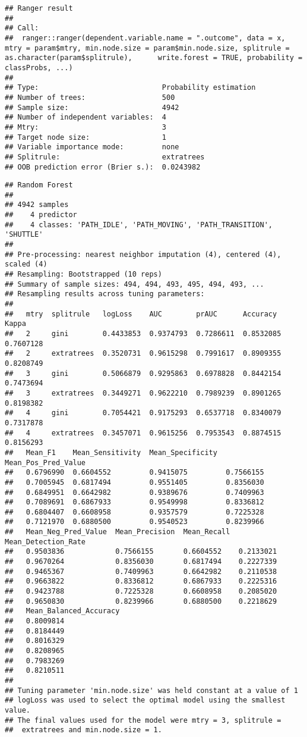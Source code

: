 \documentclass[]{article}
\begin{document}
\begin{verbatim}
## Ranger result
## 
## Call:
##  ranger::ranger(dependent.variable.name = ".outcome", data = x,      mtry = param$mtry, min.node.size = param$min.node.size, splitrule = as.character(param$splitrule),      write.forest = TRUE, probability = classProbs, ...) 
## 
## Type:                             Probability estimation 
## Number of trees:                  500 
## Sample size:                      4942 
## Number of independent variables:  4 
## Mtry:                             3 
## Target node size:                 1 
## Variable importance mode:         none 
## Splitrule:                        extratrees 
## OOB prediction error (Brier s.):  0.0243982
\end{verbatim}

\begin{verbatim}
## Random Forest 
## 
## 4942 samples
##    4 predictor
##    4 classes: 'PATH_IDLE', 'PATH_MOVING', 'PATH_TRANSITION', 'SHUTTLE' 
## 
## Pre-processing: nearest neighbor imputation (4), centered (4), scaled (4) 
## Resampling: Bootstrapped (10 reps) 
## Summary of sample sizes: 494, 494, 493, 495, 494, 493, ... 
## Resampling results across tuning parameters:
## 
##   mtry  splitrule   logLoss    AUC        prAUC      Accuracy   Kappa    
##   2     gini        0.4433853  0.9374793  0.7286611  0.8532085  0.7607128
##   2     extratrees  0.3520731  0.9615298  0.7991617  0.8909355  0.8208749
##   3     gini        0.5066879  0.9295863  0.6978828  0.8442154  0.7473694
##   3     extratrees  0.3449271  0.9622210  0.7989239  0.8901265  0.8198382
##   4     gini        0.7054421  0.9175293  0.6537718  0.8340079  0.7317878
##   4     extratrees  0.3457071  0.9615256  0.7953543  0.8874515  0.8156293
##   Mean_F1    Mean_Sensitivity  Mean_Specificity  Mean_Pos_Pred_Value
##   0.6796990  0.6604552         0.9415075         0.7566155          
##   0.7005945  0.6817494         0.9551405         0.8356030          
##   0.6849951  0.6642982         0.9389676         0.7409963          
##   0.7089691  0.6867933         0.9549998         0.8336812          
##   0.6804407  0.6608958         0.9357579         0.7225328          
##   0.7121970  0.6880500         0.9540523         0.8239966          
##   Mean_Neg_Pred_Value  Mean_Precision  Mean_Recall  Mean_Detection_Rate
##   0.9503836            0.7566155       0.6604552    0.2133021          
##   0.9670264            0.8356030       0.6817494    0.2227339          
##   0.9465367            0.7409963       0.6642982    0.2110538          
##   0.9663822            0.8336812       0.6867933    0.2225316          
##   0.9423788            0.7225328       0.6608958    0.2085020          
##   0.9650830            0.8239966       0.6880500    0.2218629          
##   Mean_Balanced_Accuracy
##   0.8009814             
##   0.8184449             
##   0.8016329             
##   0.8208965             
##   0.7983269             
##   0.8210511             
## 
## Tuning parameter 'min.node.size' was held constant at a value of 1
## logLoss was used to select the optimal model using the smallest value.
## The final values used for the model were mtry = 3, splitrule =
##  extratrees and min.node.size = 1.
\end{verbatim}
\end{document}
